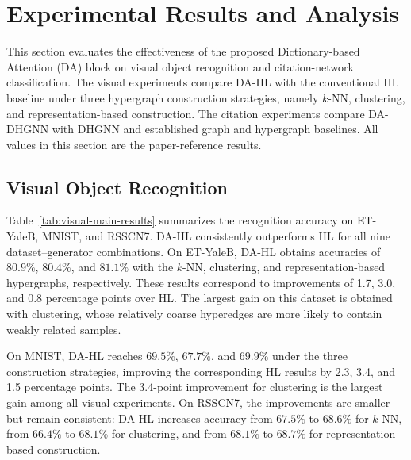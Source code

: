 \section{Experimental Results and Analysis}
\label{sec:experimental-results}

This section evaluates the effectiveness of the proposed Dictionary-based
Attention (DA) block on visual object recognition and citation-network
classification. The visual experiments compare DA-HL with the conventional HL
baseline under three hypergraph construction strategies, namely $k$-NN,
clustering, and representation-based construction. The citation experiments
compare DA-DHGNN with DHGNN and established graph and hypergraph baselines. All
values in this section are the paper-reference results.

\subsection{Visual Object Recognition}

Table~\ref{tab:visual-main-results} summarizes the recognition accuracy on
ET-YaleB, MNIST, and RSSCN7. DA-HL consistently outperforms HL for all nine
dataset--generator combinations. On ET-YaleB, DA-HL obtains accuracies of
$80.9\%$, $80.4\%$, and $81.1\%$ with the $k$-NN, clustering, and
representation-based hypergraphs, respectively. These results correspond to
improvements of 1.7, 3.0, and 0.8 percentage points over HL. The largest gain
on this dataset is obtained with clustering, whose relatively coarse
hyperedges are more likely to contain weakly related samples.

On MNIST, DA-HL reaches $69.5\%$, $67.7\%$, and $69.9\%$ under the three
construction strategies, improving the corresponding HL results by 2.3, 3.4,
and 1.5 percentage points. The 3.4-point improvement for clustering is the
largest gain among all visual experiments. On RSSCN7, the improvements are
smaller but remain consistent: DA-HL increases accuracy from $67.5\%$ to
$68.6\%$ for $k$-NN, from $66.4\%$ to $68.1\%$ for clustering, and from
$68.1\%$ to $68.7\%$ for representation-based construction.

